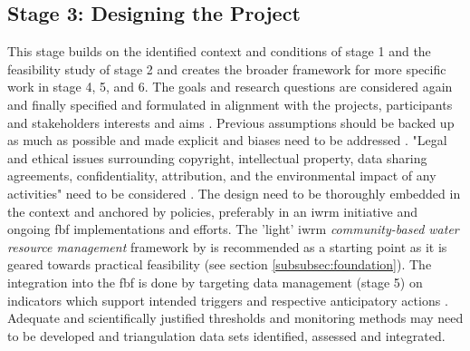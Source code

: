 \subsection{Stage 3: Designing the Project}

This stage builds on the identified context and conditions of stage 1 and the feasibility study of stage 2 and creates the broader framework for more specific work in stage 4, 5, and 6. The goals and research questions are considered again and finally specified and formulated in alignment with the projects, participants and stakeholders interests and aims \autocite{conradReviewCitizenScience2011,fraislCitizenScienceEnvironmental2022,minkmanCitizenScienceWater2015}. Previous assumptions should be backed up as much as possible and made explicit \autocite{silvertownNewDawnCitizen2009} and biases need to be addressed \autocite{escaeuropeancitizenscienceassociationTenPrinciplesCitizen2015,fraislCitizenScienceEnvironmental2022}. "Legal and ethical issues surrounding copyright, intellectual property, data sharing agreements, confidentiality, attribution, and the environmental impact of any activities" need to be considered \autocite{escaeuropeancitizenscienceassociationTenPrinciplesCitizen2015}. The design need to be thoroughly embedded in the context and anchored by policies, preferably in an \acrlong{iwrm} initiative \autocite{cervoniImplementingIntegratedWater2008,sharpeCommunityBasedEcological2006} and ongoing \acrshort{fbf} implementations and efforts. The 'light' \acrshort{iwrm} \textit{community-based water resource management} framework by \autocite{dayCommunitybasedWaterResources2009} is recommended as a starting point as it is geared towards practical feasibility (see section \ref*{subsubsec:foundation}). The integration into the \acrshort{fbf} is done by targeting data management (stage 5) on indicators which support intended triggers and respective anticipatory actions \autocite{ifrcCommunityBasedSurveillanceGuiding2017}. Adequate and scientifically justified thresholds and monitoring methods may need to be developed and triangulation data sets identified, assessed and integrated. \newline
